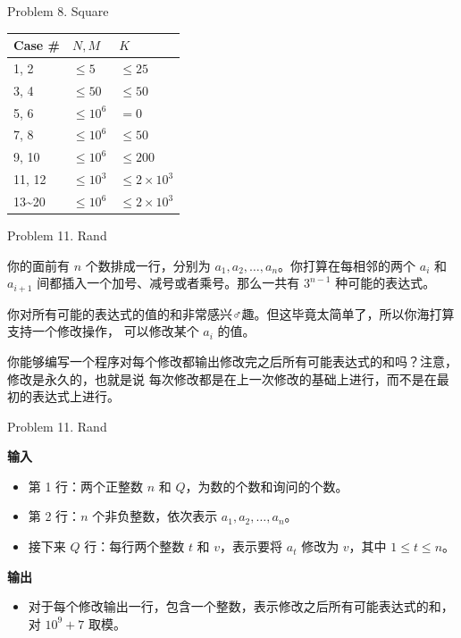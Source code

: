 \documentclass[UTF8]{beamer}
\begin{document}
\begin{frame}{Problem 8. Square}

\begin{tabularx}{\textwidth}{X|X|X} \hline
Case \# & $N, M$ & $K$ \\ \hline \hline
1, 2   & $\leq 5$    & $\leq 25$            \\ \hline
3, 4   & $\leq 50$   & $\leq 50$            \\ \hline
5, 6   & $\leq 10^6$ & $= 0$                \\ \hline
7, 8   & $\leq 10^6$ & $\leq 50$            \\ \hline
9, 10  & $\leq 10^6$ & $\leq 200$           \\ \hline
11, 12 & $\leq 10^3$ & $\leq 2 \times 10^3$ \\ \hline
13\textasciitilde 20 & $\leq 10^6$ & $\leq 2 \times 10^3$ \\ \hline
\end{tabularx}

\end{frame}


\begin{frame}{Problem 11. Rand}

你的面前有 $n$ 个数排成一行，分别为 $a_1, a_2, \dots, a_n$。你打算在每相邻的两个
$a_i$ 和 $a_{i+1}$ 间都插入一个加号、减号或者乘号。那么一共有 $3^{n-1}$ 种可能的表达式。

你对所有可能的表达式的值的和非常感兴♂趣。但这毕竟太简单了，所以你海打算支持一个修改操作，
可以修改某个 $a_i$ 的值。

你能够编写一个程序对每个修改都输出修改完之后所有可能表达式的和吗？注意，修改是永久的，也就是说
每次修改都是在上一次修改的基础上进行，而不是在最初的表达式上进行。

\end{frame}

\begin{frame}{Problem 11. Rand}

\textbf{输入}
\begin{itemize}
    \item 第 1 行：两个正整数 $n$ 和 $Q$，为数的个数和询问的个数。
    \item 第 2 行：$n$ 个非负整数，依次表示 $a_1, a_2, \dots, a_n$。
    \item 接下来 $Q$ 行：每行两个整数 $t$ 和 $v$，表示要将 $a_t$ 修改为 $v$，其中 $1 \leq t \leq n$。
\end{itemize}
\textbf{输出}
\begin{itemize}
    \item 对于每个修改输出一行，包含一个整数，表示修改之后所有可能表达式的和，对 $10^9 + 7$ 取模。
\end{itemize}

\end{frame}
\end{document}

